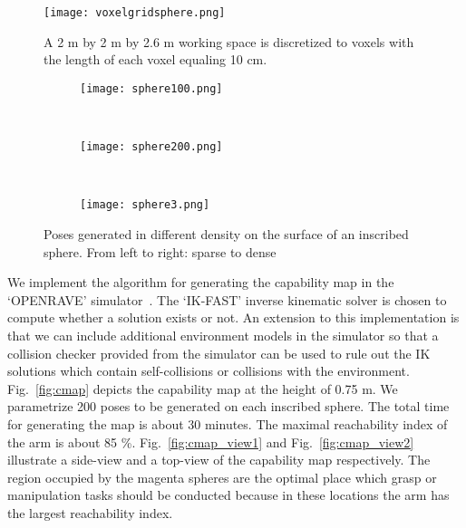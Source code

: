 \begin{figure}[!htbp]
\centering
\texttt{[image: voxelgridsphere.png]}
\captionsetup{justification=raggedright}
\caption{A 2 m by 2 m by 2.6 m working space is discretized to voxels with the length  of each voxel equaling 10 cm. }
\label{fig:voxelgrid_sphere}       %
\end{figure} 


\begin{figure}[!htbp]
    \centering
    \begin{subfigure}[b]{0.25\textwidth}
        \texttt{[image: sphere100.png]}
        \caption{}
        \label{fig:sphere1}
    \end{subfigure}
    ~ %
    \begin{subfigure}[b]{0.25\textwidth}
        \texttt{[image: sphere200.png]}
        \caption{}
        \label{fig:sphere2}
    \end{subfigure}
    ~ %
    \begin{subfigure}[b]{0.25\textwidth}
        \texttt{[image: sphere3.png]}
        \caption{}
        \label{fig:sphere3}
    \end{subfigure}
    \caption{Poses generated in different density on the surface of an inscribed sphere. From left to right: sparse to dense}\label{fig:inscribed_sphere}
\end{figure}

We implement the algorithm for generating the capability map in the `OPENRAVE' simulator~\cite{Diankov2008}. The `IK-FAST' inverse kinematic solver is chosen to compute  whether a solution exists or not. An extension to this implementation is that we can include additional environment models in the simulator so that a collision checker provided from the simulator can be used to rule out the IK solutions which contain self-collisions or collisions with the environment. Fig.~\ref{fig:cmap} depicts the capability map at the height of 0.75 m. We parametrize 200 poses to be generated on each inscribed sphere. The total time for generating the map is about 30 minutes. The maximal reachability index of the arm is about 85 \%. Fig.~\ref{fig:cmap_view1} and Fig.~\ref{fig:cmap_view2} illustrate a side-view and a top-view of the capability map respectively. The region occupied by the magenta spheres are the optimal place which grasp or manipulation tasks should be conducted  because in these locations the arm has the largest reachability index. 

